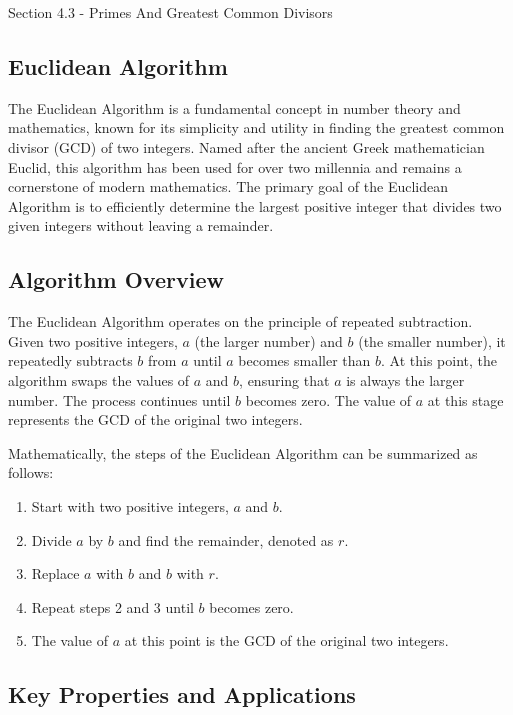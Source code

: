 \begin{notes}{Section 4.3 - Primes And Greatest Common Divisors}
    \subsection*{Euclidean Algorithm}

    The Euclidean Algorithm is a fundamental concept in number theory and mathematics, known for its simplicity and utility in finding the greatest common divisor (GCD) of two integers. Named after 
    the ancient Greek mathematician Euclid, this algorithm has been used for over two millennia and remains a cornerstone of modern mathematics. The primary goal of the Euclidean Algorithm is to 
    efficiently determine the largest positive integer that divides two given integers without leaving a remainder.
    
    \subsection*{Algorithm Overview}
    
    The Euclidean Algorithm operates on the principle of repeated subtraction. Given two positive integers, $a$ (the larger number) and $b$ (the smaller number), it repeatedly subtracts $b$ from $a$ 
    until $a$ becomes smaller than $b$. At this point, the algorithm swaps the values of $a$ and $b$, ensuring that $a$ is always the larger number. The process continues until $b$ becomes zero. The 
    value of $a$ at this stage represents the GCD of the original two integers.
    
    Mathematically, the steps of the Euclidean Algorithm can be summarized as follows:
    \begin{enumerate}
        \item Start with two positive integers, $a$ and $b$.
        \item Divide $a$ by $b$ and find the remainder, denoted as $r$.
        \item Replace $a$ with $b$ and $b$ with $r$.
        \item Repeat steps 2 and 3 until $b$ becomes zero.
        \item The value of $a$ at this point is the GCD of the original two integers.
    \end{enumerate}
    
    \subsection*{Key Properties and Applications}
    

\end{notes}
